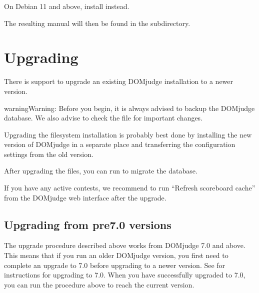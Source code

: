 \documentclass[a4paper,10pt,english,openany]{sphinxmanual}
\begin{document}
\sphinxAtStartPar
On Debian 11 and above, install
 instead.

\sphinxAtStartPar
The resulting manual will then be found in the  subdirectory.

\sphinxstepscope


\section{Upgrading}
\label{\detokenize{upgrading:upgrading}}\label{\detokenize{upgrading::doc}}
\sphinxAtStartPar
There is support to upgrade an existing DOMjudge installation to
a newer version.

\begin{sphinxadmonition}{warning}{Warning:}
\sphinxAtStartPar
Before you begin, it is always advised to backup the DOMjudge
database. We also advise to check the  file for
important changes.
\end{sphinxadmonition}

\sphinxAtStartPar
Upgrading the filesystem installation is probably best done by
installing the new version of DOMjudge in a separate place and
transferring the configuration settings from the old version.

\sphinxAtStartPar
After upgrading the files, you can run 
to migrate the database.

\sphinxAtStartPar
If you have any active contests, we recommend to run “Refresh
scoreboard cache” from the DOMjudge web interface after the upgrade.


\subsection{Upgrading from pre\sphinxhyphen{}7.0 versions}
\label{\detokenize{upgrading:upgrading-from-pre-7-0-versions}}
\sphinxAtStartPar
The upgrade procedure described above works from DOMjudge 7.0
and above. This means that if you run an older DOMjudge version,
you first need to complete an upgrade to 7.0 before upgrading to
a newer version. See 
for instructions for upgrading to 7.0. When you have successfully
upgraded to 7.0, you can run the procedure above to reach the
current version.
\end{document}
